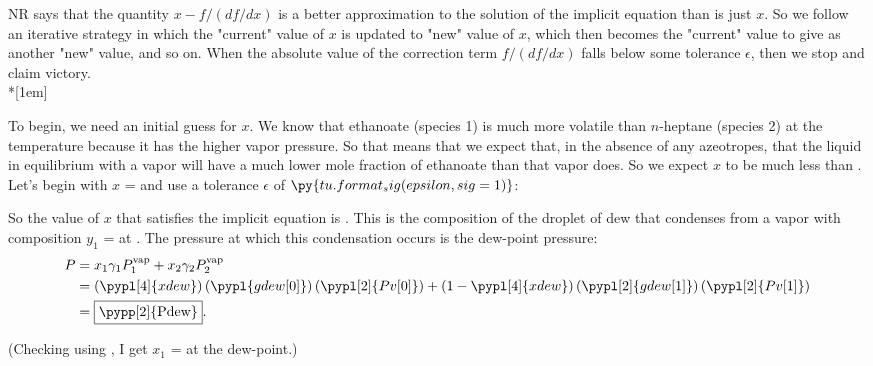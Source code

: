 \begin{enumerate}
NR says that the quantity $x - f/(df/dx)$ is a better approximation to the solution of the implicit equation than is just $x$.  So we follow an iterative strategy in which the "current" value of $x$ is updated to "new" value of $x$, which then becomes the "current" value to give as another "new" value, and so on.  When the absolute value of the correction term $f/(df/dx)$ falls below some tolerance $\epsilon$, then we stop and claim victory.\\*[1em]

To begin, we need an initial guess for $x$.  We know that ethanoate (species 1) is much more volatile than $n$-heptane (species 2) at the temperature because it has the higher vapor pressure.  So that means that we expect that, in the absence of any azeotropes, that the liquid in equilibrium with a vapor will have a much lower mole fraction of ethanoate than that vapor does.  So we expect $x$ to be much less than . Let's begin with $x$ =  and use a tolerance $\epsilon$ of \(\py{tu.format_sig(epsilon, sig=1)}\):

\begin{table}[h]
\begin{center}
\end{center}
\end{table}

So the value of $x$ that satisfies the implicit equation is .  This is the composition of the droplet of dew that condenses from a vapor with composition $y_1$ =  at .  The pressure at which this condensation occurs is the dew-point pressure:
\begin{align*}
    P & = x_1\gamma_1P_1^{\rm vap} + x_2 \gamma_2 P_2^{\rm vap}\\
    & = \left(\pypl[4]{xdew}\right)\left(\pypl{gdew[0]}\right)\left(\pypl[2]{Pv[0]}\right) + \left(1-\pypl[4]{xdew}\right)\left(\pypl[2]{gdew[1]}\right)\left(\pypl[2]{Pv[1]}\right)\\
    & = \fbox{\pypp[2]{Pdew}}.
\end{align*}

(Checking using , I get $x_1$ =  at the dew-point.)


\end{enumerate}

